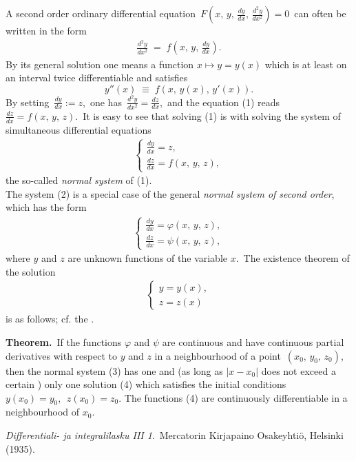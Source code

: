 \documentclass[12pt]{article}
\theoremstyle{definition}
\begin{document}
A second order ordinary differential equation\, $F(x,\,y,\,\frac{dy}{dx},\,\frac{d^2y}{dx^2}) = 0$\, can often be written in the form
\begin{align}
\frac{d^2y}{dx^2} \;=\; f\left(x,\,y,\,\frac{dy}{dx}\right).
\end{align}
By its general solution one means a function \; $x \mapsto y = y(x)$\; which is at least on an interval twice differentiable and satisfies
\[y''(x) \;\equiv\; f(x,\,y(x),\,y'(x)).\]
By setting\, $\frac{dy}{dx} := z$,\, one has\, $\frac{d^2y}{dx^2} = \frac{dz}{dx}$,\, and the equation (1) reads\, 
$\frac{dz}{dx} = f(x,\,y,\,z)$.\, It is easy to see that solving (1) is  with solving the system of simultaneous  differential equations
\begin{align}
\begin{cases}
\frac{dy}{dx} = z,\\
\frac{dz}{dx} = f(x,\,y,\,z),
\end{cases}
\end{align}
the so-called {\em normal system} of (1).\\

The system (2) is a special case of the general {\em normal system of second order}, which has the form
\begin{align}
\begin{cases}
\frac{dy}{dx} = \varphi(x,\,y,\,z),\\
\frac{dz}{dx} = \psi(x,\,y,\,z),
\end{cases}
\end{align}
where $y$ and $z$ are unknown functions of the variable $x$.\, The existence theorem of the solution
\begin{align}
\begin{cases}
y = y(x),\\
z = z(x)
\end{cases}
\end{align}
is as follows; cf. the .

\textbf{Theorem.}\, If the functions $\varphi$ and $\psi$ are continuous and have continuous partial derivatives with respect to $y$ and $z$ in a neighbourhood of a point \,$(x_0,\,y_0,\,z_0)$,\, then the normal system (3) has one and (as long as $|x\!-\!x_0|$ does not exceed a certain ) only one solution (4)
which satisfies the initial conditions \, $y(x_0) = y_0,\;\, z(x_0) = z_0$.\; The functions (4) are continuously differentiable in a neighbourhood of $x_0$.

\begin{thebibliography}{9}
 {\em Differentiali- ja integralilasku III 1}.\, Mercatorin Kirjapaino Osakeyhti\"o, Helsinki (1935).
\end{thebibliography}


\end{document}
